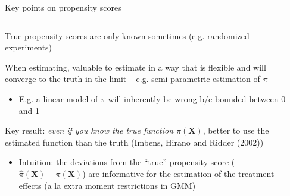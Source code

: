 \documentclass[notes,11pt, aspectratio=169]{beamer}
\newenvironment{wideitemize}{\itemize\addtolength{\itemsep}{10pt}}{\enditemize}
\begin{document}
\begin{frame}{Key points on propensity scores}
\begin{columns}[T] %
\begin{column}{.8\textwidth}
  \begin{wideitemize}
  \item True propensity scores are only known sometimes (e.g. randomized experiments)
  \item When estimating, valuable to estimate in a way that is
    flexible and will converge to the truth in the limit --
    e.g. semi-parametric estimation of $\pi$
    \begin{itemize}
    \item E.g. a linear model of $\pi$ will inherently be wrong b/c
      bounded between 0 and 1
    \end{itemize}
  \item Key result: \emph{even if you know the true function
      $\pi(\mathbf{X})$}, better to use the estimated function than the truth (Imbens, Hirano and Ridder (2002))
    \begin{itemize}
    \item Intuition: the deviations from the ``true'' propensity score
      ($\hat{\pi}(\mathbf{X}) - \pi(\mathbf{X})$) are informative for
      the estimation of the treatment effects (a la extra moment
      restrictions in GMM)
    \end{itemize}
    \end{wideitemize}
\end{column}%
\hfill%
\begin{column}{.4\textwidth}

\end{column}%
\end{columns}
\end{frame}
\end{document}
